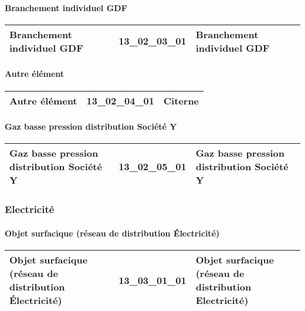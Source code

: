\documentclass[12pt,titlepage,oneside]{book}
\begin{document}
\paragraph{Branchement individuel GDF}
\noindent
\vspace{\baselineskip}

\renewcommand{\arraystretch}{1.2}
\begin{supertabular}{|p{10cm}|c|p{15cm}|}
 Branchement individuel GDF & 13\_02\_03\_01 & Branchement individuel GDF\\
\hline
\end{supertabular}


\paragraph{Autre élément}
\noindent
\vspace{\baselineskip}

\renewcommand{\arraystretch}{1.2}
\begin{supertabular}{|p{10cm}|c|p{15cm}|}
 Autre élément & 13\_02\_04\_01 & Citerne\\
\hline
\end{supertabular}


\paragraph{Gaz basse pression distribution Société Y}
\noindent
\vspace{\baselineskip}

\renewcommand{\arraystretch}{1.2}
\begin{supertabular}{|p{10cm}|c|p{15cm}|}
 Gaz basse pression distribution Société Y & 13\_02\_05\_01 & Gaz basse pression distribution Société Y\\
\hline
\end{supertabular}

\subsubsection{\large Electricité}
\paragraph{Objet surfacique (réseau de distribution Électricité)}
\noindent
\vspace{\baselineskip}

\renewcommand{\arraystretch}{1.2}
\begin{supertabular}{|p{10cm}|c|p{15cm}|}
 Objet surfacique (réseau de distribution Électricité) & 13\_03\_01\_01 & Objet surfacique (réseau de distribution Electricité)\\
\hline
\end{supertabular}
\end{document}
